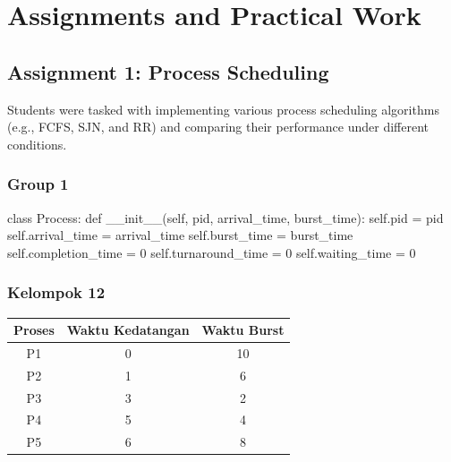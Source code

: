 \documentclass[12pt]{article}
\begin{document}
\section{Assignments and Practical Work}
\subsection{Assignment 1: Process Scheduling}
Students were tasked with implementing various process scheduling algorithms (e.g., FCFS, SJN, and RR) and comparing their performance under different conditions.
\subsubsection{Group 1}
\begin{python}
    class Process:
    def __init__(self, pid, arrival_time, burst_time):
        self.pid = pid
        self.arrival_time = arrival_time
        self.burst_time = burst_time
        self.completion_time = 0
        self.turnaround_time = 0
        self.waiting_time = 0
\end{python}

\subsubsection{Kelompok 12}



\lstset{style=mystyle}


\begin{tabular}{|c|c|c|}
  \hline
  \textbf{Proses} & \textbf{Waktu Kedatangan} & \textbf{Waktu Burst} \\
  \hline
  P1 & 0 & 10 \\
  \hline
  P2 & 1 & 6 \\
  \hline
  P3 & 3 & 2 \\
  \hline
  P4 & 5 & 4 \\
  \hline
  P5 & 6 & 8 \\
  \hline
\end{tabular}
\end{document}
